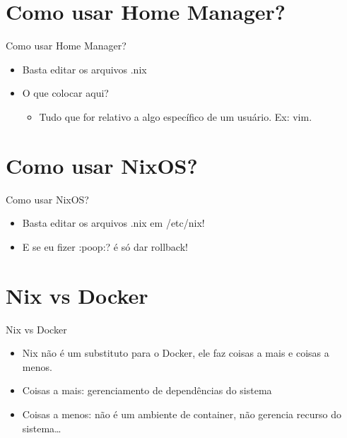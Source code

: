 \documentclass[presentation]{beamer}
\begin{document}
\section{Como usar Home Manager?}
\label{sec:org96bfd2e}
\begin{frame}[label={sec:org78ad618}]{Como usar Home Manager?}
\begin{itemize}
\item Basta editar os arquivos .nix
\item O que colocar aqui?
\begin{itemize}
\item Tudo que for relativo a algo específico de um usuário. Ex: vim.
\end{itemize}
\end{itemize}
\end{frame}

\section{Como usar NixOS?}
\label{sec:org017cf8b}
\begin{frame}[label={sec:org600c627}]{Como usar NixOS?}
\begin{itemize}
\item Basta editar os arquivos .nix em /etc/nix!
\item E se eu fizer :poop:? é só dar rollback!
\end{itemize}
\end{frame}

\section{Nix vs Docker}
\label{sec:org21806b2}
\begin{frame}[label={sec:orga353ad3}]{Nix vs Docker}
\begin{itemize}
\item Nix não é um substituto para o Docker, ele faz coisas a mais e coisas a menos.
\item Coisas a mais: gerenciamento de dependências do sistema
\item Coisas a menos: não é um ambiente de container, não gerencia recurso do sistema\ldots{}
\end{itemize}
\end{frame}
\end{document}
